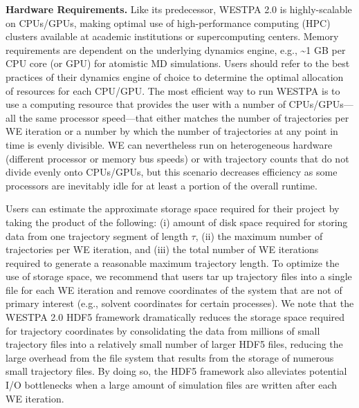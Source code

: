 \textbf{Hardware Requirements.} Like its predecessor, WESTPA 2.0 is highly-scalable on CPUs/GPUs, making optimal use of high-performance computing (HPC) clusters available at academic institutions or supercomputing centers. 
Memory requirements are dependent on the underlying dynamics engine, e.g., \textasciitilde1 GB per CPU core (or GPU) for atomistic MD simulations. 
Users should refer to the best practices of their dynamics engine of choice to determine the optimal allocation of resources for each CPU/GPU. 
The most efficient way to run WESTPA is to use a computing resource that provides the user with a number of CPUs/GPUs---all the same processor speed---that either matches the number of trajectories per WE iteration or a number by which the number of trajectories at any point in time is evenly divisible. 
WE can nevertheless run on heterogeneous hardware (different processor or memory bus speeds) or with trajectory counts that do not divide evenly onto CPUs/GPUs, but this scenario decreases efficiency as some processors are inevitably idle for at least a portion of the overall runtime.

Users can estimate the approximate storage space required for their project by taking the product of the following: (i) amount of disk space required for storing data from one trajectory segment of length $\tau$, (ii) the maximum number of trajectories per WE iteration, and (iii) the total number of WE iterations required to generate a reasonable maximum trajectory length. 
To optimize the use of storage space, we recommend that users tar up trajectory files into a single file for each WE iteration and remove coordinates of the system that are not of primary interest (e.g., solvent coordinates for certain processes). 
We note that the WESTPA 2.0 HDF5 framework dramatically reduces the storage space required for trajectory coordinates by consolidating the data from millions of small trajectory files into a relatively small number of larger HDF5 files, reducing the large overhead from the file system that results from the storage of numerous small trajectory files. 
By doing so, the HDF5 framework also alleviates potential I/O bottlenecks when a large amount of simulation files are written after each WE iteration. 